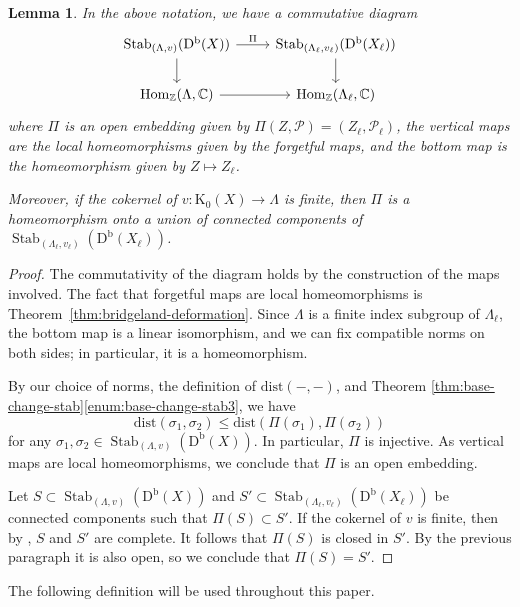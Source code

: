\documentclass[11pt, reqno]{amsart}
\numberwithin{equation}{section}
\theoremstyle{plain}
\newtheorem{lemma}[theorem]{Lemma}
\theoremstyle{remark}
\theoremstyle{definition}
\theoremstyle{italicsname}
\newcommand{\Db}{\mathrm{D^b}}
\DeclareMathOperator{\Stab}{Stab}
\DeclareMathOperator{\Hom}{Hom}
\newcommand{\cP}{\mathscr{P}}
\newcommand{\rK}{\mathrm{K}}
\def\CC{\ensuremath{\mathbb{C}}}
\def\ZZ{\ensuremath{\mathbb{Z}}}
\begin{document}
\begin{lemma}\label{lem:base-change-stab-manifold}
In the above notation, we have a commutative diagram
\[\begin{tikzcd}
	{\Stab_{(\Lambda, v)}(\Db(X))} & {\Stab_{(\Lambda_{\ell}, v_{\ell})}(\Db(X_{\ell}))} \\
	{\Hom_{\ZZ}(\Lambda, \CC)} & {\Hom_{\ZZ}(\Lambda_{\ell}, \CC)}
    \arrow["\Pi", from=1-1, to=1-2]
	\arrow[from=1-1, to=2-1]
	\arrow[from=1-2, to=2-2]
	\arrow[from=2-1, to=2-2]
\end{tikzcd}\]
where $\Pi$ is an open embedding given by $\Pi(Z,\cP)=(Z_{\ell},\cP_{\ell})$, 
the vertical maps are the local homeomorphisms given by the forgetful maps, 
and the bottom map is the homeomorphism given by $Z \mapsto Z_{\ell}$. 

Moreover, if the cokernel of $v \colon \rK_0(X) \to \Lambda$ is finite, then $\Pi$ is a homeomorphism onto a union of connected components of $\Stab_{(\Lambda_{\ell}, v_{\ell})}(\Db(X_{\ell}))$.
\end{lemma}

\begin{proof}
The commutativity of the diagram holds by the construction of the maps involved. 
The fact that forgetful maps are local homeomorphisms is Theorem~\ref{thm:bridgeland-deformation}. 
Since $\Lambda$ is a finite index subgroup of $\Lambda_{\ell}$, the bottom map is a linear isomorphism, and we can fix compatible norms on both sides; in particular, it is a homeomorphism. 

By our choice of norms, the definition of $\mathrm{dist}(-,-)$, and Theorem \ref{thm:base-change-stab}\ref{enum:base-change-stab3}, we have $$\mathrm{dist}(\sigma_1,\sigma_2)\leq \mathrm{dist}(\Pi(\sigma_1), \Pi(\sigma_2))$$ for any $\sigma_1,\sigma_2\in \Stab_{(\Lambda, v)}(\Db(X))$. In particular, $\Pi$ is injective. 
As vertical maps are local homeomorphisms, we conclude that 
$\Pi$ is an open embedding.

Let $S \subset \Stab_{(\Lambda, v)}(\Db(X))$ and $S'\subset\Stab_{(\Lambda_{\ell}, v_{\ell})}(\Db(X_{\ell}))$ be connected components such that $\Pi(S)\subset S'$. If the cokernel of $v$ is finite, then by \cite[Theorem 3.7]{woolf}, $S$ and $S'$ are complete. It follows that $\Pi(S)$ is closed in $S'$. By the previous paragraph it is also open, so we conclude that $\Pi(S)=S'$.
\end{proof}

The following definition will be used throughout this paper.
\end{document}
